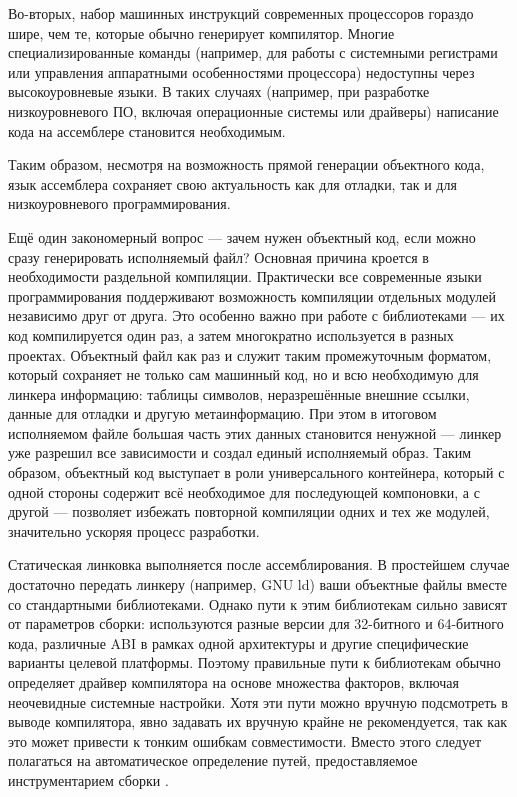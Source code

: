 Во-вторых, набор машинных инструкций современных процессоров гораздо шире, чем те, которые обычно генерирует компилятор. Многие специализированные команды (например, для работы с системными регистрами или управления аппаратными особенностями процессора) недоступны через высокоуровневые языки. В таких случаях (например, при разработке низкоуровневого ПО, включая операционные системы или драйверы) написание кода на ассемблере становится необходимым.

Таким образом, несмотря на возможность прямой генерации объектного кода, язык ассемблера сохраняет свою актуальность как для отладки, так и для низкоуровневого программирования.

Ещё один закономерный вопрос — зачем нужен объектный код, если можно сразу генерировать исполняемый файл? Основная причина кроется в необходимости раздельной компиляции. Практически все современные языки программирования поддерживают возможность компиляции отдельных модулей независимо друг от друга. Это особенно важно при работе с библиотеками — их код компилируется один раз, а затем многократно используется в разных проектах. Объектный файл как раз и служит таким промежуточным форматом, который сохраняет не только сам машинный код, но и всю необходимую для линкера информацию: таблицы символов, неразрешённые внешние ссылки, данные для отладки и другую метаинформацию. При этом в итоговом исполняемом файле большая часть этих данных становится ненужной — линкер уже разрешил все зависимости и создал единый исполняемый образ. Таким образом, объектный код выступает в роли универсального контейнера, который с одной стороны содержит всё необходимое для последующей компоновки, а с другой — позволяет избежать повторной компиляции одних и тех же модулей, значительно ускоряя процесс разработки.

Статическая линковка выполняется после ассемблирования. В простейшем случае достаточно передать линкеру (например, GNU ld) ваши объектные файлы вместе со стандартными библиотеками. Однако пути к этим библиотекам сильно зависят от параметров сборки: используются разные версии для 32-битного и 64-битного кода, различные ABI в рамках одной архитектуры и другие специфические варианты целевой платформы. Поэтому правильные пути к библиотекам обычно определяет драйвер компилятора на основе множества факторов, включая неочевидные системные настройки. Хотя эти пути можно вручную подсмотреть в выводе компилятора, явно задавать их вручную крайне не рекомендуется, так как это может привести к тонким ошибкам совместимости. Вместо этого следует полагаться на автоматическое определение путей, предоставляемое инструментарием сборки \cite{Vladimirov2024}.

